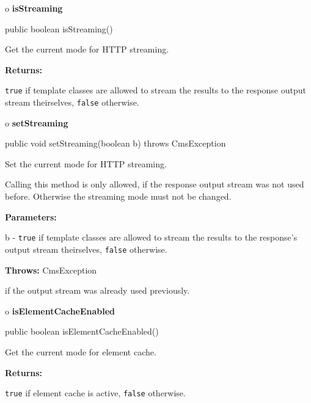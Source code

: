 o {\bf isStreaming} 

\begin{PRE}
 public boolean isStreaming()
\end{PRE}

\begin{description}
\htmlDD Get the current mode for HTTP streaming. 

\begin{description}
\item {\bf Returns:}  

{\tt true} if template classes are allowed to stream the  results to the
response output stream theirselves, {\tt false} otherwise.  
\end{description}

\end{description}

o {\bf setStreaming} 

\begin{PRE}
 public void setStreaming(boolean b) throws CmsException
\end{PRE}

\begin{description}
\htmlDD Set the current mode for HTTP streaming.

Calling this method is only allowed, if the response output stream was not
used before. Otherwise the streaming mode must not be changed. 

\begin{description}
\item {\bf Parameters:}  

b - {\tt true} if template classes are allowed to stream the  results to the
response's output stream theirselves, {\tt false} otherwise.  
\item {\bf Throws:} CmsException  

if the output stream was already used previously.  
\end{description}

\end{description}

o {\bf isElementCacheEnabled} 

\begin{PRE}
 public boolean isElementCacheEnabled()
\end{PRE}

\begin{description}
\htmlDD Get the current mode for element cache. 

\begin{description}
\item {\bf Returns:}  

{\tt true} if element cache is active, {\tt false} otherwise.  
\end{description}

\end{description}

